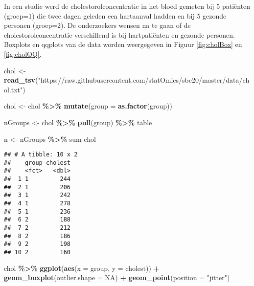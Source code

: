 \documentclass[
  12pt,dutch,coursenotes]{book}
\newenvironment{Shaded}{\begin{snugshade}}{\end{snugshade}}
\newcommand{\DataTypeTok}[1]{\textcolor[rgb]{0.13,0.29,0.53}{#1}}
\newcommand{\KeywordTok}[1]{\textcolor[rgb]{0.13,0.29,0.53}{\textbf{#1}}}
\newcommand{\NormalTok}[1]{#1}
\newcommand{\OperatorTok}[1]{\textcolor[rgb]{0.81,0.36,0.00}{\textbf{#1}}}
\newcommand{\OtherTok}[1]{\textcolor[rgb]{0.56,0.35,0.01}{#1}}
\newcommand{\StringTok}[1]{\textcolor[rgb]{0.31,0.60,0.02}{#1}}
\theoremstyle{definition}
\theoremstyle{definition}
\theoremstyle{definition}
\theoremstyle{remark}
\begin{document}
In een studie werd de cholestorolconcentratie in het bloed gemeten bij 5 patiënten (groep=1) die twee dagen geleden een hartaanval hadden en bij 5 gezonde personen (groep=2).
De onderzoekers wensen na te gaan of de cholestorolconcentratie verschillend is bij hartpatiënten en gezonde personen.
Boxplots en qqplots van de data worden weergegeven in Figuur \ref{fig:cholBox} en \ref{fig:cholQQ}.

\begin{Shaded}
\begin{Highlighting}[]
\NormalTok{chol \textless{}{-}}\StringTok{ }\KeywordTok{read\_tsv}\NormalTok{(}\StringTok{"https://raw.githubusercontent.com/statOmics/sbc20/master/data/chol.txt"}\NormalTok{)}

\NormalTok{chol \textless{}{-}}\StringTok{ }\NormalTok{chol }\OperatorTok{\%\textgreater{}\%}\StringTok{ }\KeywordTok{mutate}\NormalTok{(}\DataTypeTok{group =} \KeywordTok{as.factor}\NormalTok{(group))}

\NormalTok{nGroups \textless{}{-}}\StringTok{ }\NormalTok{chol }\OperatorTok{\%\textgreater{}\%}\StringTok{ }\KeywordTok{pull}\NormalTok{(group) }\OperatorTok{\%\textgreater{}\%}\StringTok{ }\NormalTok{table}

\NormalTok{n \textless{}{-}}\StringTok{ }\NormalTok{nGroups }\OperatorTok{\%\textgreater{}\%}\StringTok{ }\NormalTok{sum}
\NormalTok{chol}
\end{Highlighting}
\end{Shaded}

\begin{verbatim}
## # A tibble: 10 x 2
##    group cholest
##    <fct>   <dbl>
##  1 1         244
##  2 1         206
##  3 1         242
##  4 1         278
##  5 1         236
##  6 2         188
##  7 2         212
##  8 2         186
##  9 2         198
## 10 2         160
\end{verbatim}

\begin{Shaded}
\begin{Highlighting}[]
\NormalTok{chol }\OperatorTok{\%\textgreater{}\%}\StringTok{ }\KeywordTok{ggplot}\NormalTok{(}\KeywordTok{aes}\NormalTok{(}\DataTypeTok{x =}\NormalTok{ group, }\DataTypeTok{y =}\NormalTok{ cholest)) }\OperatorTok{+}\StringTok{ }\KeywordTok{geom\_boxplot}\NormalTok{(}\DataTypeTok{outlier.shape =} \OtherTok{NA}\NormalTok{) }\OperatorTok{+}\StringTok{ }
\StringTok{    }\KeywordTok{geom\_point}\NormalTok{(}\DataTypeTok{position =} \StringTok{"jitter"}\NormalTok{)}
\end{Highlighting}
\end{Shaded}
\end{document}
